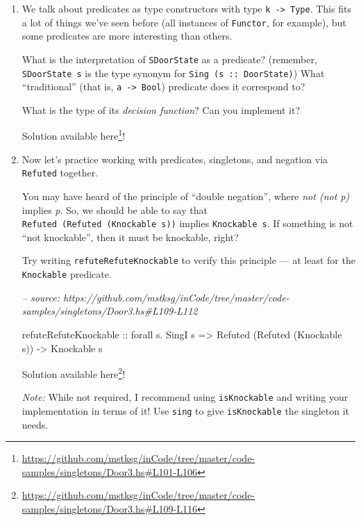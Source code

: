 \documentclass[]{article}
\newenvironment{Shaded}{}{}
\newcommand{\CommentTok}[1]{\textcolor[rgb]{0.38,0.63,0.69}{\textit{#1}}}
\newcommand{\DataTypeTok}[1]{\textcolor[rgb]{0.56,0.13,0.00}{#1}}
\newcommand{\FunctionTok}[1]{\textcolor[rgb]{0.02,0.16,0.49}{#1}}
\newcommand{\NormalTok}[1]{#1}
\newcommand{\OtherTok}[1]{\textcolor[rgb]{0.00,0.44,0.13}{#1}}
\renewcommand{\href}[2]{#2\footnote{\url{#1}}}
\begin{document}
\begin{enumerate}
\def\labelenumi{\arabic{enumi}.}
\item
  We talk about predicates as type constructors with type
  \texttt{k\ -\textgreater{}\ Type}. This fits a lot of things we've seen before
  (all instances of \texttt{Functor}, for example), but some predicates are more
  interesting than others.

  What is the interpretation of \texttt{SDoorState} as a predicate? (remember,
  \texttt{SDoorState\ s} is the type synonym for
  \texttt{Sing\ (s\ ::\ DoorState)}) What ``traditional'' (that is,
  \texttt{a\ -\textgreater{}\ Bool}) predicate does it correspond to?

  What is the type of its \emph{decision function}? Can you implement it?

  Solution available
  \href{https://github.com/mstksg/inCode/tree/master/code-samples/singletons/Door3.hs\#L101-L106}{here}!
\item
  Now let's practice working with predicates, singletons, and negation via
  \texttt{Refuted} together.

  You may have heard of the principle of ``double negation'', where \emph{not
  (not p)} implies \emph{p}. So, we should be able to say that
  \texttt{Refuted\ (Refuted\ (Knockable\ s))} implies \texttt{Knockable\ s}. If
  something is not ``not knockable'', then it must be knockable, right?

  Try writing \texttt{refuteRefuteKnockable} to verify this principle --- at
  least for the \texttt{Knockable} predicate.

\begin{Shaded}
\begin{Highlighting}[]
\CommentTok{-- source: https://github.com/mstksg/inCode/tree/master/code-samples/singletons/Door3.hs#L109-L112}

\NormalTok{refuteRefuteKnockable}
\OtherTok{    ::}\NormalTok{ forall s}\FunctionTok{.} \DataTypeTok{SingI}\NormalTok{ s}
    \OtherTok{=>} \DataTypeTok{Refuted}\NormalTok{ (}\DataTypeTok{Refuted}\NormalTok{ (}\DataTypeTok{Knockable}\NormalTok{ s))}
    \OtherTok{->} \DataTypeTok{Knockable}\NormalTok{ s}
\end{Highlighting}
\end{Shaded}

  Solution available
  \href{https://github.com/mstksg/inCode/tree/master/code-samples/singletons/Door3.hs\#L109-L116}{here}!

  \emph{Note:} While not required, I recommend using \texttt{isKnockable} and
  writing your implementation in terms of it! Use \texttt{sing} to give
  \texttt{isKnockable} the singleton it needs.


\end{enumerate}
\end{document}
